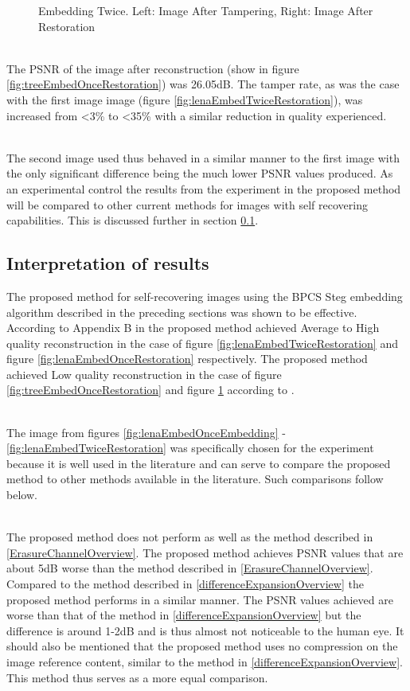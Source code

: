 \documentclass[12pt]{article}
\begin{document}
\begin{figure}[h]
{}%
\caption{Embedding Twice. Left: Image After Tampering, Right: Image After Restoration}
\label{fig:treeEmbedTwiceRestoration}
\end{figure}

\hspace{0pt} \\
The PSNR of the image after reconstruction (show in figure \ref{fig:treeEmbedOnceRestoration}) was 26.05dB.
The tamper rate, as was the case with the first image image (figure \ref{fig:lenaEmbedTwiceRestoration}), was increased from \textless 3\% to \textless 35\% with a similar reduction in quality experienced.

\hspace{0pt} \\
The second image used thus behaved in a similar manner to the first image with the only significant difference being the much lower PSNR values produced. As an experimental control the results from the experiment in the proposed method will be compared to other current methods for images with self recovering capabilities.
This is discussed further in  section \ref{interpretation}.

\subsection{Interpretation of results}
\label{interpretation}
The proposed method for self-recovering images using the BPCS Steg embedding algorithm described in the preceding sections was shown to be effective.
According to Appendix B in \cite{korus2013efficient} the proposed method achieved Average to High quality reconstruction in the case of figure \ref{fig:lenaEmbedTwiceRestoration} and figure \ref{fig:lenaEmbedOnceRestoration} respectively.
The proposed method achieved Low quality reconstruction in the case of figure \ref{fig:treeEmbedOnceRestoration} and figure \ref{fig:treeEmbedTwiceRestoration} according to \cite{korus2013efficient}.

\hspace{0pt} \\
The image from figures \ref{fig:lenaEmbedOnceEmbedding} - \ref{fig:lenaEmbedTwiceRestoration} was specifically chosen for the experiment because it is well used in the literature and can serve to compare the proposed method to other methods available in the literature.
Such comparisons follow below. 

\hspace{0pt} \\
The proposed method does not perform as well as the method described in \ref{ErasureChannelOverview}.
The proposed method achieves PSNR values that are about 5dB worse than the method described in \ref{ErasureChannelOverview}.
Compared to the method described in \ref{differenceExpansionOverview} the proposed method performs in a similar manner.
The PSNR values achieved are worse than that of the method in \ref{differenceExpansionOverview} but the difference is around 1-2dB and is thus almost not noticeable to the human eye.
It should also be mentioned that the proposed method uses no compression on the image reference content, similar to the method in \ref{differenceExpansionOverview}.
This method thus serves as a more equal comparison. 
\end{document}
